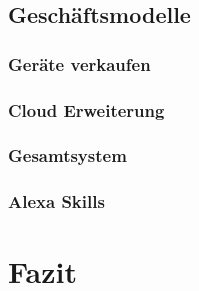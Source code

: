 \subsection{Geschäftsmodelle}


\subsubsection{Geräte verkaufen} %


\subsubsection{Cloud Erweiterung} %


\subsubsection{Gesamtsystem} %


\subsubsection{Alexa Skills} %



\section{Fazit}

